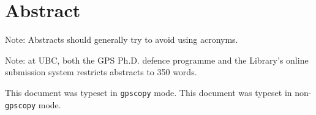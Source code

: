 
\chapter{Abstract}



Note: Abstracts should generally try to avoid using acronyms.

Note: at \ac{UBC}, both the \ac{GPS} Ph.D. defence programme and the
Library's online submission system restricts abstracts to 350
words.

\ifgpscopy
  This document was typeset in \texttt{gpscopy} mode.
\else
  This document was typeset in non-\texttt{gpscopy} mode.
\fi


